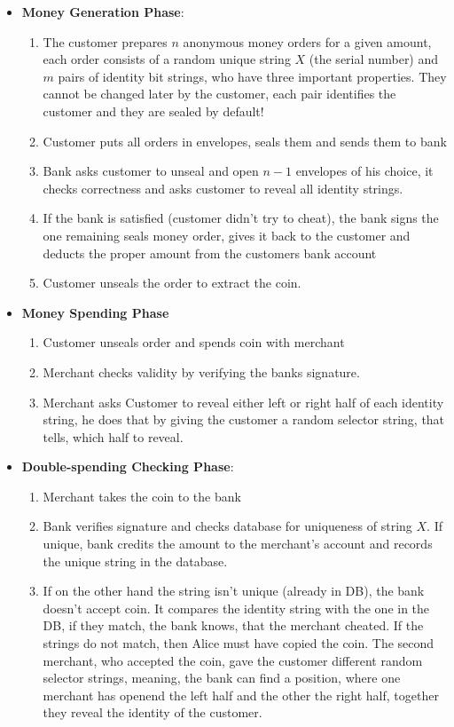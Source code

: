 \documentclass[a4paper, 10 pt, conference]{ieeeconf}
\begin{document}
\begin{itemize}
\item \textbf{Money Generation Phase}:\\ \begin{enumerate}
\item The customer prepares $n$ anonymous money orders for a given amount, each order consists of a random unique string $X$ (the serial number) and $m$ pairs of identity bit strings, who have three important properties. They cannot be changed later by the customer, each pair identifies the customer and they are sealed by default!
\item Customer puts all orders in envelopes, seals them and sends them to bank
\item Bank asks customer to unseal and open $n-1$ envelopes of his choice, it checks correctness and asks customer to reveal all identity strings.
\item If the bank is satisfied (customer didn't try to cheat), the bank signs the one remaining seals money order, gives it back to the customer and deducts the proper amount from the customers bank account
\item Customer unseals the order to extract the coin. 
\end{enumerate}
\item \textbf{Money Spending Phase} \\
\begin{enumerate}
\item Customer unseals order and spends coin with merchant
\item Merchant checks validity by verifying the banks signature.
\item Merchant asks Customer to reveal either left or right half of each identity string, he does that by giving the customer a random selector string, that tells, which half to reveal.
\end{enumerate}
\item \textbf{Double-spending Checking Phase}: \\
\begin{enumerate}
\item Merchant takes the coin to the bank
\item Bank verifies signature and checks database for uniqueness of string $X$. If unique, bank credits the amount to the merchant's account and records the unique string in the database. 
\item If on the other hand the string isn't unique (already in DB), the bank doesn't accept coin. It compares the identity string with the one in the DB, if they match, the bank knows, that the merchant cheated. If the strings do not match, then Alice must have copied the coin. The second merchant, who accepted the coin, gave the customer different random selector strings, meaning, the bank can find a position, where one merchant has openend the left half and the other the right half, together they reveal the identity of the customer.
\end{enumerate}
\end{itemize}
\end{document}
